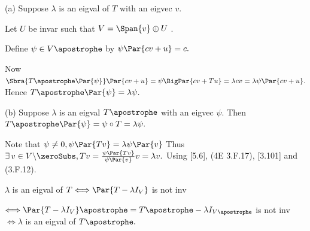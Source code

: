 \par\quad
(a) Suppose $\lambda$ is an eigval of $T$ with an eigvec $v.$\par\quad\Ha
Let $U$ be invar such that $V=\Span{v}\oplus U$ .\par\quad\Ha
Define $\psi\in V\apostrophe$ by $\psi\Par{cv+u}=c.$\vspace{2pt}\par\quad\Ha
Now $\Sbra{T\apostrophe\Par{\psi}}\Par{cv+u}=\psi\BigPar{cv+Tu}=\lambda cv=\lambda\psi\Par{cv+u}.$ Hence $T\apostrophe\Par{\psi}=\lambda\psi.$\vspace{4pt}\par\quad
(b) Suppose $\lambda$ is an eigval $T\apostrophe$ with an eigvec $\psi.$ Then $T\apostrophe\Par{\psi}=\psi\circ T=\lambda\psi.$\par\quad\Hb
Note that $\psi\neq 0,\psi\Par{Tv}=\lambda\psi\Par{v}$ Thus $\exists\,v\in V\backslash\zeroSubs,Tv=\frac{\psi\Par{Tv}}{\psi\Par{v}}v=\lambda v.$\PfEnd\vspace{8pt}\quad
{} Using [5.6], (4E 3.F.17), [3.101] and (3.F.12).\par\quad
$\lambda$ is an eigval of $T\Longleftrightarrow\Par{T-\lambda I_V}$ is not inv\par\quad
{} $\Longleftrightarrow\Par{T-\lambda I_V}\apostrophe=T\apostrophe-\lambda I_{V\apostrophe}$ is not inv $\Longleftrightarrow\lambda$ is an eigval of $T\apostrophe.$\PfEnd
\SepLine

